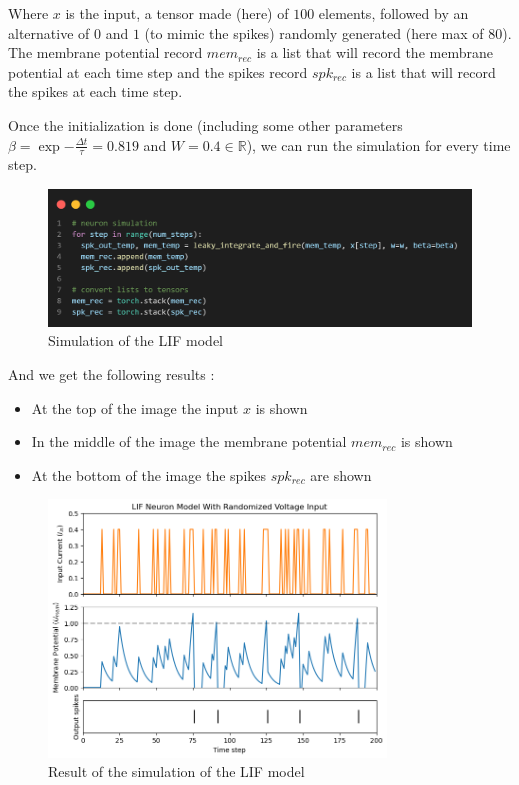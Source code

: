 \documentclass[11pt]{article}
\begin{document}
Where $x$ is the input, a tensor made (here) of $100$ elements, followed by an alternative of $0$ and $1$ (to mimic the spikes) randomly generated (here max of $80$). The membrane potential record $mem_{rec}$ is a list that will record the membrane potential at each time step and the spikes record $spk_{rec}$ is a list that will record the spikes at each time step.

Once the initialization is done (including some other parameters $\beta = \exp{- \frac{\Delta t}{\tau}} = 0.819$ and $W = 0.4 \in \mathbb{R}$), we can run the simulation for every time step.

\begin{figure}[H]
  \begin{center}
    \includegraphics[width=\textwidth]{image/lif_example.png}
    \caption{Simulation of the LIF model}
    \label{fig:lif_sim}
  \end{center}
\end{figure}

And we get the following results :

\begin{itemize}
  \item At the top of the image the input $x$ is shown
  \item In the middle of the image the membrane potential $mem_{rec}$ is shown
  \item At the bottom of the image the spikes $spk_{rec}$ are shown
\end{itemize}

\begin{figure}[H]
  \begin{center}
    \includegraphics[width=0.8\textwidth]{image/output_lif1.png}
    \caption{Result of the simulation of the LIF model}
    \label{fig:lif_res}
  \end{center}
\end{figure}
\end{document}
